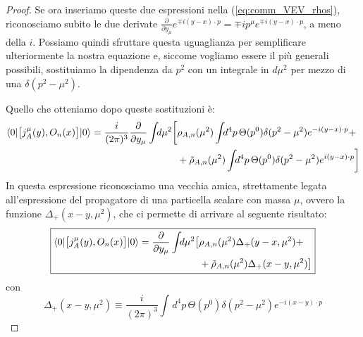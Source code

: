 \documentclass[../main.tex]{subfiles}
\begin{document}
\begin{proof}
    Se ora inseriamo queste due espressioni nella (\ref{eq:comm_VEV_rhos}), riconosciamo subito le due derivate $\frac{\partial}{\partial y_\mu} e^{\mp i (y-x)\cdot p}= \mp ip^{\mu}e^{\mp i (y-x)\cdot p}$, a meno della $i$. Possiamo quindi sfruttare questa uguaglianza per semplificare ulteriormente la nostra equazione e, siccome vogliamo essere il più generali possibili, sostituiamo la dipendenza da $p^2$ con un integrale in $d\mu^2$ per mezzo di una $\delta(p^2-\mu^2)$.

    Quello che otteniamo dopo queste sostituzioni è:
    \begin{align*}
        \langle 0|\big[j^\mu_A(y), O_n(x)\big]|0\rangle =\frac{i}{(2\pi)^3}\frac{\partial}{\partial y_\mu}\int_{}d\mu^2
        \bigg[&\rho_{A,n}(\mu^2) \int_{}d^4p\,\Theta(p^0)\delta(p^2-\mu^2) e^{-i(y-x)\cdot p}+ \\ 
        &+\Tilde{\rho}_{A,n}(\mu^2)\int_{}d^4p\,\Theta(p^0)\delta(p^2-\mu^2)e^{i(y-x)\cdot p}\bigg]
    \end{align*}
    In questa espressione riconosciamo una vecchia amica, strettamente legata all'espressione del propagatore di una particella scalare con massa $\mu$, ovvero la funzione $\Delta_+(x-y, \mu^2)$, che ci permette di arrivare al seguente risultato:
    \begin{equation}
        \boxed{\begin{aligned}
            \langle 0|\big[j^\mu_A(y), O_n(x)\big]|0\rangle =\frac{\partial}{\partial y_\mu}\int_{}d\mu^2\big[&\rho_{A,n}(\mu^2) \Delta_+(y-x, \mu^2) + \\ &+\Tilde{\rho}_{A,n}(\mu^2)\Delta_+(x-y, \mu^2)\big]
        \end{aligned}}
        \label{eq:comm_VEV_Delta+}
    \end{equation}
    con
    \begin{equation}
        \boxed{\Delta_+(x-y,\mu^2) \equiv \frac{i}{(2\pi)^3}\int_{}d^4p\,\Theta(p^0)\delta(p^2-\mu^2)e^{-i(x-y)\cdot p}}
        \label{eq:Delta+}
    \end{equation}


\end{proof}
\end{document}
